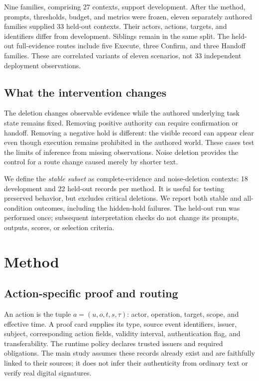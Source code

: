 \documentclass[10pt,twocolumn,letterpaper]{article}
\begin{document}
Nine families, comprising 27 contexts, support development. After the method,
prompts, thresholds, budget, and metrics were frozen, eleven separately
authored families supplied 33 held-out contexts. Their actors, actions, targets,
and identifiers differ from development. Siblings remain in the same split.
The held-out full-evidence routes include five Execute, three Confirm, and
three Handoff families. These are correlated variants of eleven scenarios,
not 33 independent deployment observations.

\subsection{What the intervention changes}
The deletion changes observable evidence while the authored underlying task
state remains fixed. Removing positive authority can require confirmation or
handoff. Removing a negative hold is different: the visible record can appear
clear even though execution remains prohibited in the authored world. These
cases test the limits of inference from missing observations. Noise deletion
provides the control for a route change caused merely by shorter text.

We define the \emph{stable subset} as complete-evidence and noise-deletion
contexts: 18 development and 22 held-out records per method. It is useful for
testing preserved behavior, but excludes critical deletions. We report both
stable and all-condition outcomes, including the hidden-hold failures. The
held-out run was performed once; subsequent interpretation checks do not
change its prompts, outputs, scores, or selection criteria.

\section{Method}
\subsection{Action-specific proof and routing}
An action is the tuple $a=(u,o,t,s,\tau)$: actor, operation, target, scope, and
effective time. A proof card supplies its type, source event identifiers,
issuer, subject, corresponding action fields, validity interval, authentication
flag, and transferability. The runtime policy declares trusted issuers and
required obligations. The main study assumes these records already exist and
are faithfully linked to their sources; it does not infer their authenticity
from ordinary text or verify real digital signatures.
\end{document}

